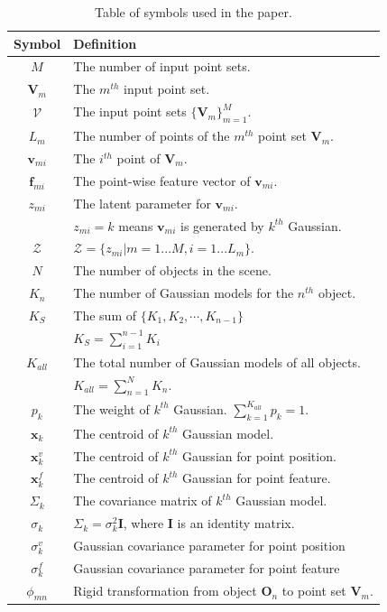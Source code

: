 \begin{table}[!hbp]
\centering
\caption{Table of symbols used in the paper.} 
\label{tab:symbol}
\begin{tabular}{c|l}
\hline
Symbol         & Definition\\
\hline
$M$            & The number of input point sets.\\
$\mathbf{V}_m$ & The $m^{th}$ input point set.\\
$\mathcal{V}$  & The input point sets $\{\mathbf{V}_m\}^{M}_{m=1}$.\\
$L_m$          & The number of points of the $m^{th}$ point set $\mathbf{V}_m$.\\
$\pmb{v}_{mi}$ & The $i^{th}$ point of $\mathbf{V}_m$.\\
$\pmb f_{mi}$   & The point-wise feature vector of $\pmb v_{mi}$.\\
$z_{mi}$       & The latent parameter for $\pmb v_{mi}$.\\
               & $z_{mi}=k$ means $\pmb{v}_{mi}$ is generated by $k^{th}$ Gaussian. \\
$\mathcal{Z}$            & $\mathcal{Z}=\{z_{mi}|m=1...M,i=1...L_m\}$.\\
$N$            & The number of objects in the scene.\\
$K_n$          & The number of Gaussian models for the $n^{th}$ object. \\
$K_S$		   & The sum of $\{K_1,K_2,\cdots,K_{n-1}\}$\\
			   & $K_S = \sum_{i=1}^{n-1}K_i$\\
$K_{all}$      & The total number of Gaussian models of all objects. \\
               & $K_{all} = \sum_{n=1}^N K_n $.\\
$p_k$          & The weight of $k^{th}$ Gaussian. $\sum_{k=1}^{K_{all}}p_k=1$.\\
$\pmb x_k$     & The centroid of $k^{th}$ Gaussian model.\\
$\pmb {x}^{v}_k$   & The centroid of $k^{th}$ Gaussian for point position.\\
$\pmb {x}^{f}_k$   & The centroid of $k^{th}$ Gaussian for point feature.\\
$\Sigma_k$     & The covariance matrix of $k^{th}$ Gaussian model.\\
$\sigma_k$     & $\Sigma_k=\sigma_k^2\mathbf{I}$, where $\mathbf{I}$ is an identity matrix.\\
$\sigma^v_k$   & Gaussian covariance parameter for point position\\
$\sigma^f_k$   & Gaussian covariance parameter for point feature\\
$\phi_{mn}$    & Rigid transformation from object $\mathbf{O}_n$ to point set $\mathbf{V}_m$.\\
\hline
\end{tabular}
\end{table}
